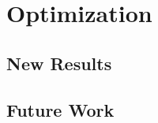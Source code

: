 \documentclass[9pt, handout, aspectratio=169]{beamer}		%
\begin{document}
\section{Optimization}


	\subsection{New Results}


	\subsection{Future Work}

\end{document}
